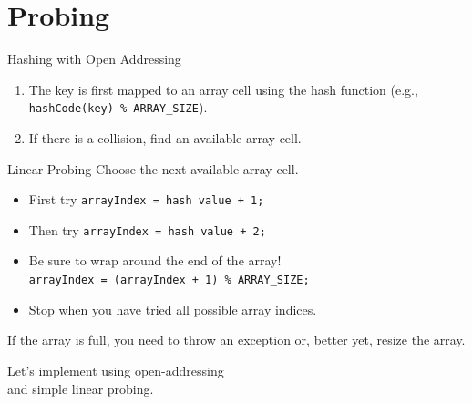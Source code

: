 \documentclass[14pt,aspectratio=1610]{beamer}
\begin{document}
\section{Probing}

\begin{frame}[fragile]{Hashing with Open Addressing}
\begin{enumerate}
  \item
    The key is first mapped to an array cell using the hash function (e.g., \lstinline{hashCode(key) % ARRAY_SIZE}).
  \item<2->
    If there is a collision, find an available array cell.\\
\end{enumerate}
\end{frame}


\begin{frame}[fragile]{Linear Probing}
Choose the next available array cell.
\begin{itemize}
  \item
    First try \lstinline{arrayIndex = hash value + 1;}
  \item
    Then try \lstinline{arrayIndex = hash value + 2;}
  \item
    Be sure to wrap around the end of the array!\\
    \lstinline{arrayIndex = (arrayIndex + 1) % ARRAY_SIZE;}
  \item
    Stop when you have tried all possible array indices.
\end{itemize}

If the array is full, you need to throw an exception or, better yet, resize the array.

\end{frame}

\begin{frame}
  \center%
  \Large%
  Let's implement using open-addressing\\ and simple linear probing.
\end{frame}
\end{document}
